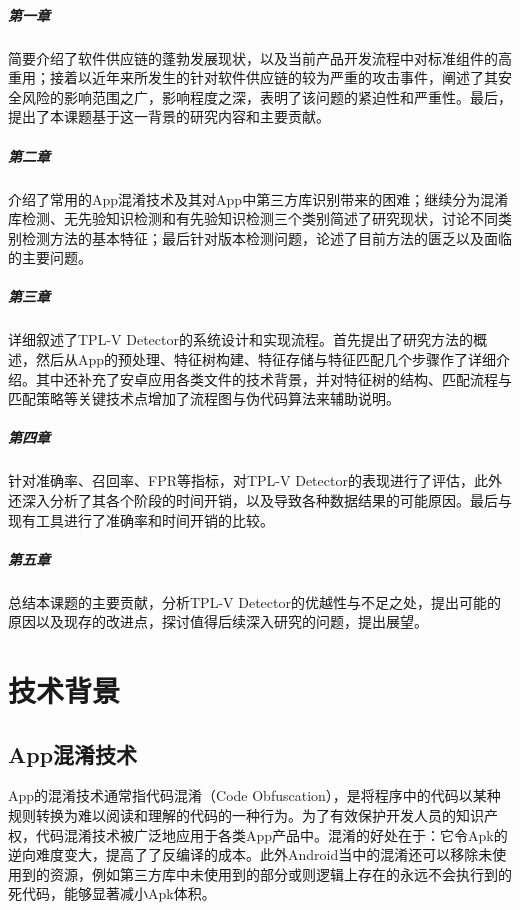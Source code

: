 \paragraph{第一章}简要介绍了软件供应链的蓬勃发展现状，以及当前产品开发流程中对标准组件的高重用；接着以近年来所发生的针对软件供应链的较为严重的攻击事件，阐述了其安全风险的影响范围之广，影响程度之深，表明了该问题的紧迫性和严重性。最后，提出了本课题基于这一背景的研究内容和主要贡献。
\paragraph{第二章}介绍了常用的App混淆技术及其对App中第三方库识别带来的困难；继续分为混淆库检测、无先验知识检测和有先验知识检测三个类别简述了研究现状，讨论不同类别检测方法的基本特征；最后针对版本检测问题，论述了目前方法的匮乏以及面临的主要问题。
\paragraph{第三章}详细叙述了TPL-V Detector的系统设计和实现流程。首先提出了研究方法的概述，然后从App的预处理、特征树构建、特征存储与特征匹配几个步骤作了详细介绍。其中还补充了安卓应用各类文件的技术背景，并对特征树的结构、匹配流程与匹配策略等关键技术点增加了流程图与伪代码算法来辅助说明。
\paragraph{第四章}针对准确率、召回率、FPR等指标，对TPL-V Detector的表现进行了评估，此外还深入分析了其各个阶段的时间开销，以及导致各种数据结果的可能原因。最后与现有工具进行了准确率和时间开销的比较。
\paragraph{第五章}总结本课题的主要贡献，分析TPL-V Detector的优越性与不足之处，提出可能的原因以及现存的改进点，探讨值得后续深入研究的问题，提出展望。


\chapter{技术背景}

\section{App混淆技术}
App的混淆技术通常指代码混淆（Code Obfuscation），是将程序中的代码以某种规则转换为难以阅读和理解的代码的一种行为。为了有效保护开发人员的知识产权，代码混淆技术被广泛地应用于各类App产品中。混淆的好处在于：它令Apk的逆向难度变大，提高了了反编译的成本。此外Android当中的混淆还可以移除未使用到的资源，例如第三方库中未使用到的部分或则逻辑上存在的永远不会执行到的死代码，能够显著减小Apk体积\cite{dong2018understanding}。

